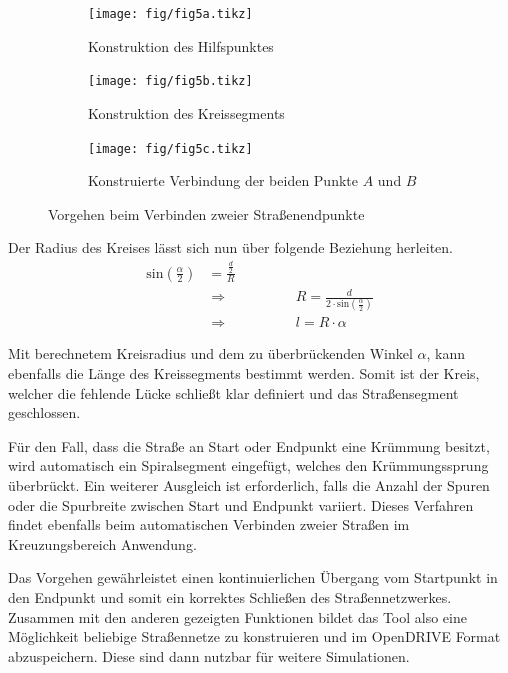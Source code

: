 \begin{figure}[H]
\flushleft
\begin{subfigure}{0.32\textwidth}
    \vspace{1.2cm}
    \texttt{[image: fig/fig5a.tikz]}
    \caption{Konstruktion des Hilfspunktes}
\end{subfigure}
\begin{subfigure}{0.32\textwidth}
    \texttt{[image: fig/fig5b.tikz]}
    \caption{Konstruktion des Kreissegments}
\end{subfigure}
\begin{subfigure}{0.32\textwidth}
    \vspace{1.65cm}
    \texttt{[image: fig/fig5c.tikz]}
    \caption{Konstruierte Verbindung der beiden Punkte \(A\) und \(B\)}
\end{subfigure}
\caption{Vorgehen beim Verbinden zweier Straßenendpunkte}
\label{abb5}
\end{figure}

Der Radius des Kreises lässt sich nun über folgende Beziehung herleiten.
\begin{align}
\text{sin}(\frac{\alpha}{2}) &= \frac{\frac{d}{2}}{R} \\
&\Rightarrow \hspace{2cm} R = \frac{d}{2 \cdot \text{sin}(\frac{\alpha}{2})} \\
&\Rightarrow \hspace{2cm} l = R \cdot \alpha
\end{align}

Mit berechnetem Kreisradius und dem zu überbrückenden Winkel \(\alpha\), kann  ebenfalls die Länge des Kreissegments bestimmt werden. Somit ist der Kreis, welcher die fehlende Lücke schließt klar definiert und das Straßensegment geschlossen.

Für den Fall, dass die Straße an Start oder Endpunkt eine Krümmung besitzt, wird automatisch ein Spiralsegment eingefügt, welches den Krümmungssprung überbrückt. Ein weiterer Ausgleich ist erforderlich, falls die Anzahl der Spuren oder die Spurbreite zwischen Start und Endpunkt variiert. Dieses Verfahren findet ebenfalls beim automatischen Verbinden zweier Straßen im Kreuzungsbereich Anwendung.

Das Vorgehen gewährleistet einen kontinuierlichen Übergang vom Startpunkt in den Endpunkt und somit ein korrektes Schließen des Straßennetzwerkes. Zusammen mit den anderen gezeigten Funktionen bildet das Tool also eine Möglichkeit beliebige Straßennetze zu konstruieren und im OpenDRIVE Format abzuspeichern. Diese sind dann nutzbar für weitere Simulationen.

